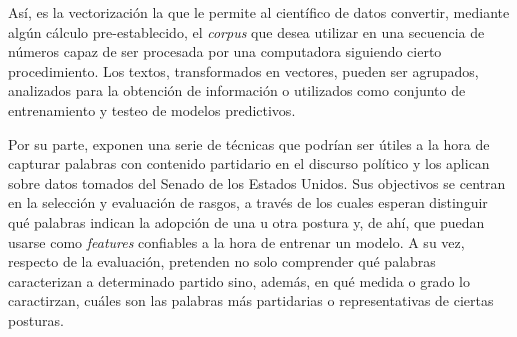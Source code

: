 \par
As\'i, es la vectorizaci\'on la que le permite al cient\'ifico de datos convertir,
mediante alg\'un c\'alculo pre-establecido, el \textit{corpus} que desea
utilizar en una secuencia de n\'umeros capaz de ser
procesada por una computadora siguiendo cierto procedimiento.
Los textos, transformados en vectores, pueden ser agrupados,
analizados para la obtenci\'on de informaci\'on o utilizados
como conjunto de entrenamiento y testeo de modelos predictivos.
\par
Por su parte, \cite{monroe2008fightin} exponen una serie de t\'ecnicas
que podr\'ian ser \'utiles a la hora de capturar palabras con contenido partidario
en el discurso pol\'itico y los aplican sobre datos tomados del Senado de los Estados
Unidos. Sus objectivos se centran en la selecci\'on y evaluaci\'on de rasgos, a trav\'es
de los cuales esperan distinguir qu\'e palabras indican la adopci\'on de una u otra postura
y, de ah\'i, que puedan usarse como \textit{features} confiables a la hora de entrenar un
modelo. A su vez, respecto de la evaluaci\'on, pretenden no solo comprender qu\'e
palabras caracterizan a determinado partido sino, adem\'as, en qu\'e medida o grado
lo caractirzan, cu\'ales son las palabras m\'as partidarias o representativas de ciertas
posturas.
